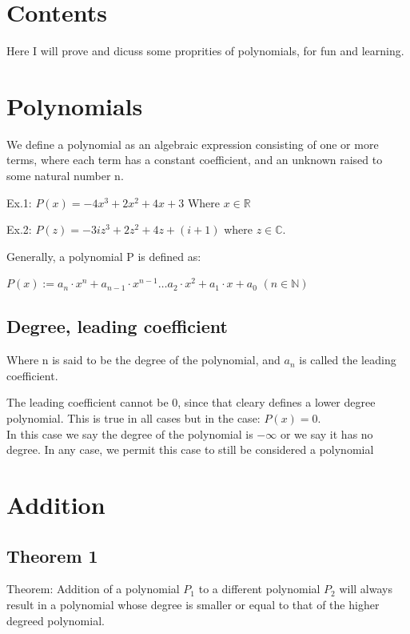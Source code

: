 \documentclass{article}
\begin{document}
\section{Contents}

Here I will prove and dicuss some proprities of polynomials, for fun and learning.

\section{Polynomials}

We define a polynomial as an algebraic expression consisting of one or more terms, where each term has a constant coefficient, and an unknown raised to some natural number n. 

Ex.1: $P(x) = -4x^3 + 2x^2 + 4x + 3$ Where $ x\in\mathbb{R}$

Ex.2: $P(z) = -3iz^3 + 2z^2 + 4z + (i+1) $ where $z \in\mathbb{C}$.

Generally, a polynomial P is defined as:

$ P(x) := a_n\cdot x^{n} + a_{n-1}\cdot x^{n-1}\dots a_2\cdot x^2 + a_1\cdot x + a_0$  $(n\in\mathbb{N})$\bigskip

\subsection{Degree, leading coefficient}

Where n is said to be the degree of the polynomial, and $a_n$ is called the leading coefficient.

The leading coefficient cannot be 0, since that cleary defines a lower degree polynomial. This is true in all cases but in the case:
$P(x)= 0$.
\\
In this case we say the degree of the polynomial is $-\infty$ or we say it has no degree. In any case, we permit this case to still be considered a polynomial

\section{Addition}

\subsection{Theorem 1}
Theorem: Addition of a polynomial $P_1$ to a different polynomial $P_2$ will always result in a polynomial whose degree is smaller or equal to that of the higher degreed polynomial.  
\end{document}
